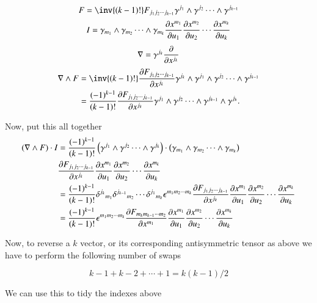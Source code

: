 \begin{equation*}
F = \inv{(k-1)!} F_{j_1 j_2 \cdots j_{k-1}} \gamma^{j_1} \wedge \gamma^{j_2} \cdots \wedge \gamma^{j_{k-1}}
\end{equation*}
\begin{equation*}
I = \gamma_{m_1} \wedge \gamma_{m_2} \cdots \wedge \gamma_{m_{k}} \PD{u_1}{x^{m_1}} \PD{u_2}{x^{m_2}} \cdots \PD{u_k}{x^{m_k}}
\end{equation*}
\begin{equation*}
\grad = \gamma^{j_k} \PD{x^{j_k}}{}
\end{equation*}
\begin{align*}
\grad \wedge F 
&= \inv{(k-1)!} \PD{x^{j_{k}}}{F_{j_1 j_2 \cdots j_{k-1}}} \gamma^{j_k} \wedge \gamma^{j_1} \wedge \gamma^{j_2} \cdots \wedge \gamma^{j_{k-1}} \\
&= \frac{(-1)^{k-1}}{(k-1)!} \PD{x^{j_{k}}}{F_{j_1 j_2 \cdots j_{k-1}}}
\gamma^{j_1} \wedge \gamma^{j_2} \cdots \wedge \gamma^{j_{k-1}} \wedge \gamma^{j_k}.
\end{align*}

Now, put this all together
\begin{align*}
(\grad \wedge F ) \cdot I
&= \frac{(-1)^{k-1}}{(k-1)!} 
\left( \gamma^{j_1} \wedge \gamma^{j_2} \cdots \wedge \gamma^{j_{k}} \right) \cdot
\left( \gamma_{m_1} \wedge \gamma_{m_2} \cdots \wedge \gamma_{m_{k}} \right) \\
&\PD{x^{j_{k}}}{F_{j_1 j_2 \cdots j_{k-1}}}
\PD{u_1}{x^{m_1}} \PD{u_2}{x^{m_2}} \cdots \PD{u_k}{x^{m_k}} \\
&= \frac{(-1)^{k-1}}{(k-1)!} 
{\delta^{j_k}}_{m_1}
{\delta^{j_{k-1}}}_{m_2}
\cdots
{\delta^{j_{1}}}_{m_k}
\epsilon^{m_1 m_2 \cdots m_k}
\PD{x^{j_{k}}}{F_{j_1 j_2 \cdots j_{k-1}}}
\PD{u_1}{x^{m_1}} \PD{u_2}{x^{m_2}} \cdots \PD{u_k}{x^{m_k}} \\
&= \frac{(-1)^{k-1}}{(k-1)!} 
\epsilon^{m_1 m_2 \cdots m_k}
\PD{x^{m_{1}}}{F_{m_k m_{k-1} \cdots m_{2}}}
\PD{u_1}{x^{m_1}} \PD{u_2}{x^{m_2}} \cdots \PD{u_k}{x^{m_k}} \\
\end{align*}

Now, to reverse a $k$ vector, or its corresponding antisymmetric tensor as above we have to perform the following number of swaps

\begin{equation*}
k-1 + k-2 + \cdots + 1 = k(k-1)/2
\end{equation*}

We can use this to tidy the indexes above 

